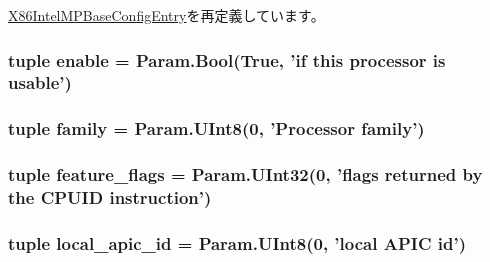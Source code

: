 \hyperlink{classIntelMP_1_1X86IntelMPBaseConfigEntry_a17da7064bc5c518791f0c891eff05fda}{X86IntelMPBaseConfigEntry}を再定義しています。\hypertarget{classIntelMP_1_1X86IntelMPProcessor_abe5c47d3a1803e0ccf098c3dc333116a}{
\subsubsection[{enable}]{\setlength{\rightskip}{0pt plus 5cm}tuple {\bf enable} = Param.Bool(True, 'if this processor is usable')}}
\label{classIntelMP_1_1X86IntelMPProcessor_abe5c47d3a1803e0ccf098c3dc333116a}
\hypertarget{classIntelMP_1_1X86IntelMPProcessor_a02b003732f44d1f2905d30d841ce3015}{
\subsubsection[{family}]{\setlength{\rightskip}{0pt plus 5cm}tuple {\bf family} = Param.UInt8(0, 'Processor {\bf family}')}}
\label{classIntelMP_1_1X86IntelMPProcessor_a02b003732f44d1f2905d30d841ce3015}
\hypertarget{classIntelMP_1_1X86IntelMPProcessor_a5308a8ffac73c8415129f79f03c86466}{
\subsubsection[{feature\_\-flags}]{\setlength{\rightskip}{0pt plus 5cm}tuple {\bf feature\_\-flags} = Param.UInt32(0, 'flags returned by the CPUID instruction')}}
\label{classIntelMP_1_1X86IntelMPProcessor_a5308a8ffac73c8415129f79f03c86466}
\hypertarget{classIntelMP_1_1X86IntelMPProcessor_a50776c26d15de124f34400db4733af9a}{
\subsubsection[{local\_\-apic\_\-id}]{\setlength{\rightskip}{0pt plus 5cm}tuple {\bf local\_\-apic\_\-id} = Param.UInt8(0, 'local APIC id')}}
